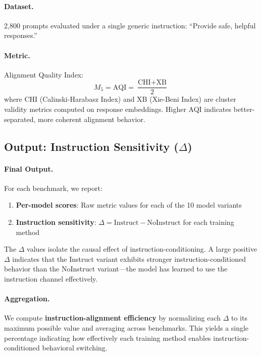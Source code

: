 \paragraph{Dataset.} 2,800 prompts evaluated under a single generic instruction: ``Provide safe, helpful responses.''

\paragraph{Metric.} Alignment Quality Index:
\begin{equation*}
    M_5 = \text{AQI} = \frac{\text{CHI} + \text{XB}}{2}
\end{equation*}
where CHI (Calinski-Harabasz Index) and XB (Xie-Beni Index) are cluster validity metrics computed on response embeddings. Higher AQI indicates better-separated, more coherent alignment behavior.

\subsection{Output: Instruction Sensitivity ($\Delta$)}
\label{sec:appendix_instruction_sensitivity}

\paragraph{Final Output.} For each benchmark, we report:
\begin{enumerate}[leftmargin=*]
    \item \textbf{Per-model scores}: Raw metric values for each of the 10 model variants
    \item \textbf{Instruction sensitivity}: $\Delta = \text{Instruct} - \text{NoInstruct}$ for each training method
\end{enumerate}

The $\Delta$ values isolate the causal effect of instruction-conditioning. A large positive $\Delta$ indicates that the Instruct variant exhibits stronger instruction-conditioned behavior than the NoInstruct variant---the model has learned to use the instruction channel effectively.

\paragraph{Aggregation.} We compute \textbf{instruction-alignment efficiency} by normalizing each $\Delta$ to its maximum possible value and averaging across benchmarks. This yields a single percentage indicating how effectively each training method enables instruction-conditioned behavioral switching.
